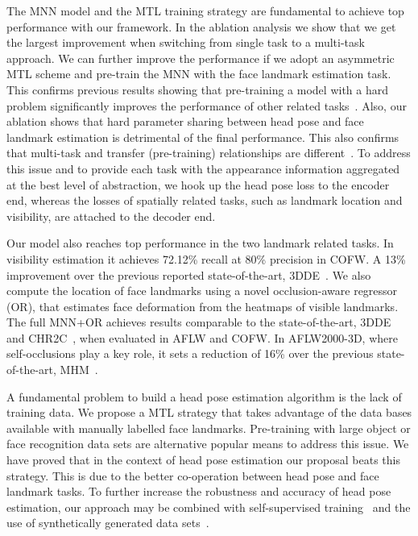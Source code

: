 \documentclass[9pt,technote,compsoc]{IEEEtran}
\begin{document}
The MNN model and the MTL training strategy are fundamental to achieve top performance with our framework. In the ablation analysis we show that we get the largest improvement when switching  from single task to a multi-task approach. We can further improve the performance if we adopt an asymmetric MTL scheme and pre-train the MNN with the face landmark estimation task. This confirms previous results showing that pre-training a model with a hard problem significantly improves the performance of other related tasks~\cite{Tran19}. Also, our ablation shows that hard parameter sharing between head pose and face landmark estimation is detrimental of the final performance. This also confirms that multi-task and transfer (pre-training) relationships are different~\cite{Standley19}. To address this issue and to provide each task with the appearance information aggregated at the best level of abstraction, we hook up the head pose loss to the encoder end, whereas the losses of spatially related tasks, such as landmark location and visibility, are attached to the decoder end. 

Our model also reaches top performance in the two landmark related tasks. In visibility estimation it achieves 72.12\% recall at 80\% precision in COFW. A 13\% improvement over the previous reported state-of-the-art, 3DDE~\cite{Valle19b}. We also compute the location of face landmarks using a novel occlusion-aware regressor (OR), that estimates face deformation from the heatmaps of visible landmarks. The full MNN+OR achieves results comparable to  the state-of-the-art, 3DDE and CHR2C~\cite{Valle19a,Valle19b}, when evaluated in AFLW and COFW. In AFLW2000-3D, where self-occlusions play a key role, it sets a reduction of 16\% over the previous state-of-the-art, MHM~\cite{Deng18}.

A fundamental problem to build a head pose estimation algorithm is the lack of training data. We propose a MTL strategy that takes advantage of the data bases available with manually labelled face landmarks. Pre-training with large object or face recognition data sets are alternative popular means to address this issue. We have proved that in the context of head pose estimation our proposal beats this strategy. This is due to the better co-operation between head pose and face landmark tasks. To further increase the robustness and accuracy of head pose estimation, our approach may be combined with self-supervised training~\cite{Wiles18b,Zhang18e,Thewlis19,Jeon19} and the use of synthetically generated data sets~\cite{Kuhnke19}.
\end{document}
